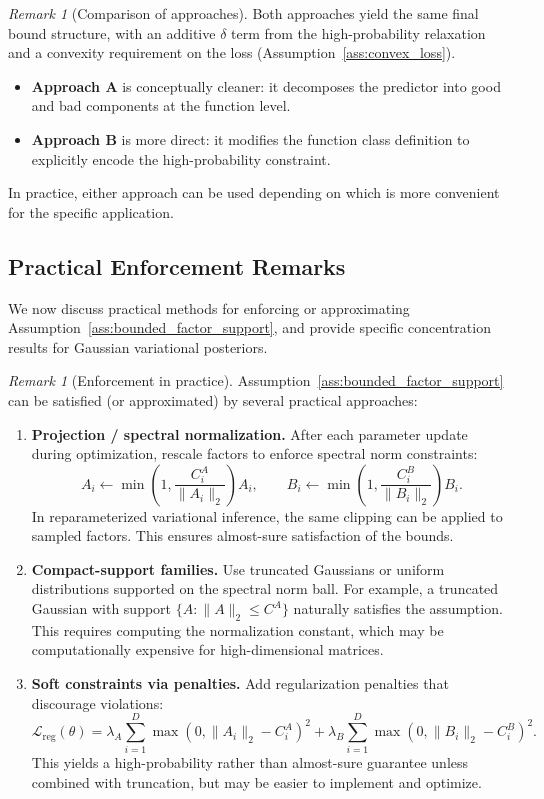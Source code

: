 \documentclass{article}
\theoremstyle{plain}
\theoremstyle{definition}
\theoremstyle{remark}
\newtheorem{remark}[theorem]{Remark}
\begin{document}
\begin{remark}[Comparison of approaches]
Both approaches yield the same final bound structure, with an additive $\delta$ term from the high-probability relaxation and a convexity requirement on the loss (Assumption~\ref{ass:convex_loss}).
\begin{itemize}
    \item \textbf{Approach A} is conceptually cleaner: it decomposes the predictor into good and bad components at the function level.
    \item \textbf{Approach B} is more direct: it modifies the function class definition to explicitly encode the high-probability constraint.
\end{itemize}
In practice, either approach can be used depending on which is more convenient for the specific application.
\end{remark}


\subsection{Practical Enforcement Remarks}\label{app:gaussian_complexity:van_handel}

We now discuss practical methods for enforcing or approximating Assumption~\ref{ass:bounded_factor_support}, and provide specific concentration results for Gaussian variational posteriors.

\begin{remark}[Enforcement in practice]
\label{rem:enforcement}
Assumption~\ref{ass:bounded_factor_support} can be satisfied (or approximated) by several practical approaches:

\begin{enumerate}
\item \textbf{Projection / spectral normalization.} After each parameter update during optimization, rescale factors to enforce spectral norm constraints:
\[
A_i \leftarrow \min\!\left(1,\frac{C_i^A}{\|A_i\|_2}\right)A_i,
\qquad
B_i \leftarrow \min\!\left(1,\frac{C_i^B}{\|B_i\|_2}\right)B_i.
\]
In reparameterized variational inference, the same clipping can be applied to sampled factors. This ensures almost-sure satisfaction of the bounds.

\item \textbf{Compact-support families.} Use truncated Gaussians or uniform distributions supported on the spectral norm ball. For example, a truncated Gaussian with support $\{A : \|A\|_2 \leq C^A\}$ naturally satisfies the assumption. This requires computing the normalization constant, which may be computationally expensive for high-dimensional matrices.

\item \textbf{Soft constraints via penalties.} Add regularization penalties that discourage violations:
\[
\mathcal{L}_{\text{reg}}(\theta) = \lambda_A \sum_{i=1}^D \max(0, \|A_i\|_2 - C_i^A)^2 + \lambda_B \sum_{i=1}^D \max(0, \|B_i\|_2 - C_i^B)^2.
\]
This yields a high-probability rather than almost-sure guarantee unless combined with truncation, but may be easier to implement and optimize.
\end{enumerate}
\end{remark}
\end{document}
